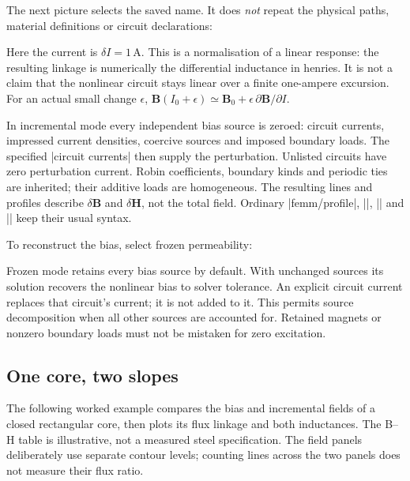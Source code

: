 The next picture selects the saved name. It does \emph{not} repeat the
physical paths, material definitions or circuit declarations:
\begin{codeexample}
\end{codeexample}
Here the current is $\delta I=1\,\mathrm A$. This is a normalisation of a
linear response: the resulting linkage is numerically the differential
inductance in henries. It is not a claim that the nonlinear circuit stays
linear over a finite one-ampere excursion. For an actual small change $\epsilon$,
$\mathbf B(I_0+\epsilon)\simeq\mathbf B_0+
\epsilon\,\partial\mathbf B/\partial I$.

In incremental mode every independent bias source is zeroed: circuit currents,
impressed current densities, coercive sources and imposed boundary loads.
The specified |circuit currents| then supply the perturbation. Unlisted
circuits have zero perturbation current. Robin coefficients, boundary kinds
and periodic ties are inherited; their additive loads are homogeneous.
The resulting lines and profiles describe $\delta\mathbf B$ and
$\delta\mathbf H$, not the total field. Ordinary |femm/profile|,
|\femmplot|, |\femmmeasure| and |\femmresultplot| keep their usual syntax.

To reconstruct the bias, select frozen permeability:
\begin{codeexample}
\end{codeexample}
Frozen mode retains every bias source by default. With unchanged sources its
solution recovers the nonlinear bias to solver tolerance. An explicit circuit
current replaces that circuit's current; it is not added to it. This permits
source decomposition when all other sources are accounted for. Retained
magnets or nonzero boundary loads must not be mistaken for zero excitation.

\subsection{One core, two slopes}
The following worked example compares the bias and incremental fields of a
closed rectangular core, then plots its flux linkage and both inductances.
The B--H table is illustrative, not a measured steel specification. The field
panels deliberately use separate contour levels; counting lines across the
two panels does not measure their flux ratio.

